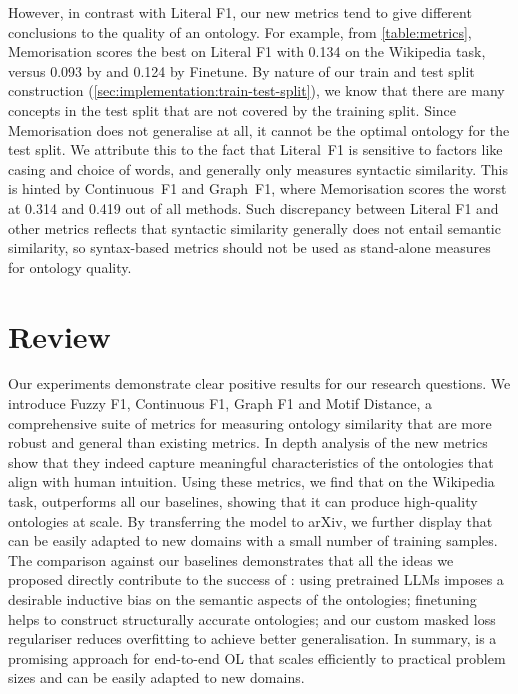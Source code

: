 However, in contrast with Literal F1, our new metrics tend to give different conclusions to the quality of an ontology. For example, from \cref{table:metrics}, Memorisation scores the best on Literal F1 with 0.134 on the Wikipedia task, versus 0.093 by \name and 0.124 by Finetune. By nature of our train and test split construction (\cref{sec:implementation:train-test-split}), we know that there are many concepts in the test split that are not covered by the training split. Since Memorisation does not generalise at all, it cannot be the optimal ontology for the test split. We attribute this to the fact that Literal~F1 is sensitive to factors like casing and choice of words, and generally only measures syntactic similarity. This is hinted by Continuous~F1 and Graph~F1, where Memorisation scores the worst at 0.314 and 0.419 out of all methods. Such discrepancy between Literal F1 and other metrics reflects that syntactic similarity generally does not entail semantic similarity, so syntax-based metrics should not be used as stand-alone measures for ontology quality.

\section{Review}

Our experiments demonstrate clear positive results for our research questions. We introduce Fuzzy F1, Continuous F1, Graph F1 and Motif Distance, a comprehensive suite of metrics for measuring ontology similarity that are more robust and general than existing metrics. In depth analysis of the new metrics show that they indeed capture meaningful characteristics of the ontologies that align with human intuition. Using these metrics, we find that on the Wikipedia task, \name outperforms all our baselines, showing that it can produce high-quality ontologies at scale. By transferring the model to arXiv, we further display that \name can be easily adapted to new domains with a small number of training samples. The comparison against our baselines demonstrates that all the ideas we proposed directly contribute to the success of \name:  using pretrained LLMs imposes a desirable inductive bias on the semantic aspects of the ontologies; finetuning helps to construct structurally accurate ontologies; and our custom masked loss regulariser reduces overfitting to achieve better generalisation. In summary, \name is a promising approach for end-to-end OL that scales efficiently to practical problem sizes and can be easily adapted to new domains.



